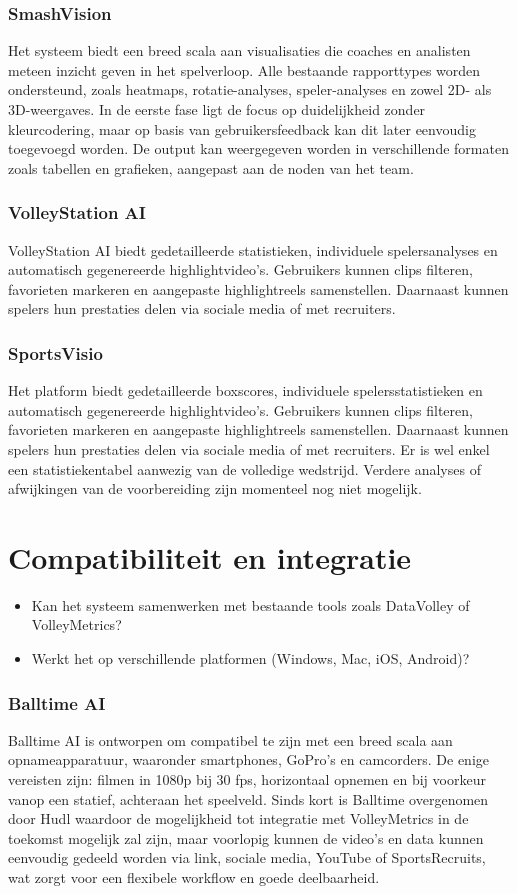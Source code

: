 \subsubsection{SmashVision}
Het systeem biedt een breed scala aan visualisaties die coaches en analisten meteen inzicht geven in het spelverloop. Alle bestaande rapporttypes worden ondersteund, zoals heatmaps, rotatie-analyses, speler-analyses en zowel 2D- als 3D-weergaves. In de eerste fase ligt de focus op duidelijkheid zonder kleurcodering, maar op basis van gebruikersfeedback kan dit later eenvoudig toegevoegd worden. De output kan weergegeven worden in verschillende formaten zoals tabellen en grafieken, aangepast aan de noden van het team.
\subsubsection{VolleyStation AI}
VolleyStation AI biedt gedetailleerde statistieken, individuele spelersanalyses en automatisch gegenereerde highlightvideo's. Gebruikers kunnen clips filteren, favorieten markeren en aangepaste highlightreels samenstellen. Daarnaast kunnen spelers hun prestaties delen via sociale media of met recruiters. 
\subsubsection{SportsVisio}
Het platform biedt gedetailleerde boxscores, individuele spelersstatistieken en automatisch gegenereerde highlightvideo's. Gebruikers kunnen clips filteren, favorieten markeren en aangepaste highlightreels samenstellen. Daarnaast kunnen spelers hun prestaties delen via sociale media of met recruiters. Er is wel enkel een statistiekentabel aanwezig van de volledige wedstrijd. Verdere analyses of afwijkingen van de voorbereiding zijn momenteel nog niet mogelijk.

\section{Compatibiliteit en integratie}
\begin{itemize}
  \item Kan het systeem samenwerken met bestaande tools zoals DataVolley of VolleyMetrics?
  \item Werkt het op verschillende platformen (Windows, Mac, iOS, Android)?
\end{itemize}
\subsubsection{Balltime AI}
Balltime AI is ontworpen om compatibel te zijn met een breed scala aan opnameapparatuur, waaronder smartphones, GoPro’s en camcorders. De enige vereisten zijn: filmen in 1080p bij 30 fps, horizontaal opnemen en bij voorkeur vanop een statief, achteraan het speelveld. Sinds kort is Balltime overgenomen door Hudl waardoor de mogelijkheid tot integratie met VolleyMetrics in de toekomst mogelijk zal zijn, maar voorlopig kunnen de video's en data kunnen eenvoudig gedeeld worden via link, sociale media, YouTube of SportsRecruits, wat zorgt voor een flexibele workflow en goede deelbaarheid.
